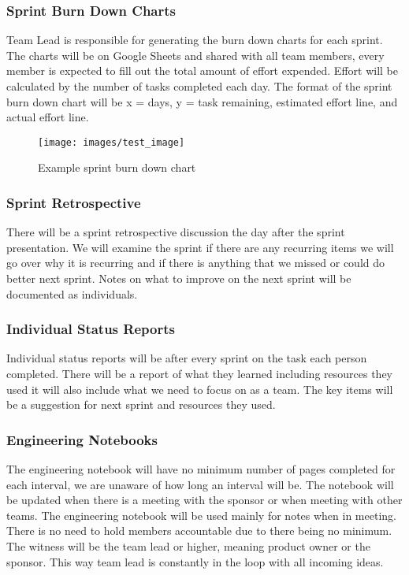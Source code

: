 \subsubsection{Sprint Burn Down Charts}
Team Lead is responsible for generating the burn down charts for each sprint. The charts will be on Google Sheets and shared with all team members, every member is expected to fill out the total amount of effort expended. Effort will be calculated by the number of tasks completed each day. The format of the sprint burn down chart will be x = days, y = task remaining, estimated effort line, and actual effort line.

\begin{figure}[h!]
    \centering
    \texttt{[image: images/test\_image]}
    \caption{Example sprint burn down chart}
\end{figure}

\subsubsection{Sprint Retrospective}
There will be a sprint retrospective discussion the day after the sprint presentation. We will examine the sprint if there are any recurring items we will go over why it is recurring and if there is anything that we missed or could do better next sprint. Notes on what to improve on the next sprint will be documented as individuals. 


\subsubsection{Individual Status Reports}
Individual status reports will be after every sprint on the task each person completed. There will be a report of what they learned including resources they used it will also include what we need to focus on as a team. The key items will be a suggestion for next sprint and resources they used.

\subsubsection{Engineering Notebooks}
The engineering notebook will have no minimum number of pages completed for each interval, we are unaware of how long an interval will be. The notebook will be updated when there is a meeting with the sponsor or when meeting with other teams. The engineering notebook will be used mainly for notes when in meeting. There is no need to hold members accountable due to there being no minimum. The witness will be the team lead or higher, meaning product owner or the sponsor. This way team lead is constantly in the loop with all incoming ideas. 


